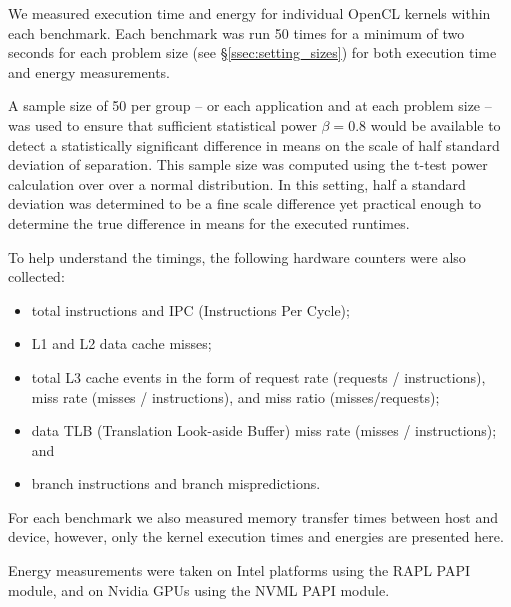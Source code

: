 \documentclass[../document.tex]{subfiles}
\begin{document}
\label{ssec:measurements}


We measured execution time and energy for individual OpenCL kernels within each benchmark.
Each benchmark was run 50 times for a minimum of two seconds for each problem size (see \S\ref{ssec:setting_sizes}) for both execution time and energy measurements.

A sample size of 50 per group -- or each application and at each problem size -- was used to ensure that sufficient statistical power $\beta = 0.8$ would be available to detect a statistically significant difference in means on the scale of half standard deviation of separation.
This sample size was computed using the t-test power calculation over over a normal distribution.
In this setting, half a standard deviation was determined to be a fine scale difference yet practical enough to determine the true difference in means for the executed runtimes.

To help understand the timings, the following hardware counters were also collected:
\begin{itemize}
	\item total instructions and IPC (Instructions Per Cycle);
	\item L1 and L2 data cache misses;
	\item total L3 cache events in the form of request rate (requests / instructions), miss rate (misses / instructions), and miss ratio (misses/requests);
	\item data TLB (Translation Look-aside Buffer) miss rate (misses / instructions); and
	\item branch instructions and branch mispredictions.
\end{itemize}
For each benchmark we also measured memory transfer times between host and device, however, only the kernel execution times and energies are presented here.

Energy measurements were taken on Intel platforms using the RAPL PAPI module, and on Nvidia GPUs using the NVML PAPI module.
\end{document}
